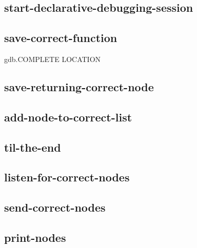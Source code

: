 \subsection{start-declarative-debugging-session}
\subsection{save-correct-function}
gdb.COMPLETE LOCATION
\subsection{save-returning-correct-node}
\subsection{add-node-to-correct-list}
\subsection{til-the-end}
\subsection{listen-for-correct-nodes}
\subsection{send-correct-nodes}
\subsection{print-nodes}